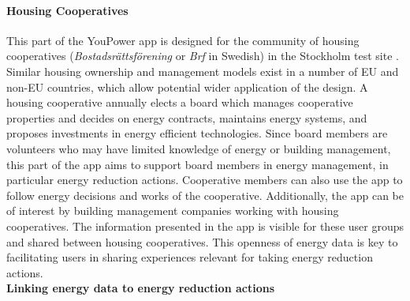 \paragraph{Housing Cooperatives}

This part of the YouPower app is designed for the community of housing cooperatives (\textit{Bostadsr{\"a}ttsf{\"o}rening} or \textit{Brf} in Swedish) in the Stockholm test site \cite{Hasselqvist2016}.
Similar housing ownership and management models exist in a number of EU and non-EU countries, which allow potential wider application of the design.
A housing cooperative annually elects a board which manages cooperative properties and decides on energy contracts, maintains energy systems, and proposes investments in energy efficient technologies. Since board members are volunteers who may have limited knowledge of energy or building management, this part of the app aims to support board members in energy management, in particular energy reduction actions. Cooperative members can also use the app to follow energy decisions and works of the cooperative. Additionally, the app can be of interest by building management companies working with housing cooperatives. 
The information presented in the app is visible for these user
groups and shared between housing cooperatives. This openness of energy data is key to
facilitating  users in sharing experiences relevant for taking energy reduction actions.\\

\textbf{Linking energy data to energy reduction actions}

